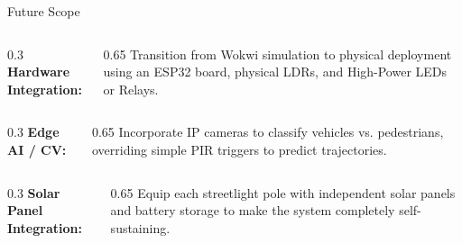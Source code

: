 \documentclass[aspectratio=169]{beamer}
\begin{document}
\begin{frame}{Future Scope}
    \begin{columns}[T]
        \begin{column}{0.3\textwidth}
            \textbf{Hardware Integration:}
        \end{column}
        \begin{column}{0.65\textwidth}
            Transition from Wokwi simulation to physical deployment using an ESP32 board, physical LDRs, and High-Power LEDs or Relays.
        \end{column}
    \end{columns}
    \vspace{0.5cm}
    \begin{columns}[T]
        \begin{column}{0.3\textwidth}
            \textbf{Edge AI / CV:}
        \end{column}
        \begin{column}{0.65\textwidth}
            Incorporate IP cameras to classify vehicles vs. pedestrians, overriding simple PIR triggers to predict trajectories.
        \end{column}
    \end{columns}
    \vspace{0.5cm}
    \begin{columns}[T]
        \begin{column}{0.3\textwidth}
            \textbf{Solar Panel Integration:}
        \end{column}
        \begin{column}{0.65\textwidth}
            Equip each streetlight pole with independent solar panels and battery storage to make the system completely self-sustaining.
        \end{column}
    \end{columns}
\end{frame}
\end{document}
